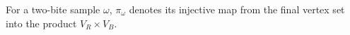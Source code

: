 \begin{definition}
For a two-bite sample \(\omega\), \(\pi_\omega\) denotes its injective map from
the final vertex set into the product \(V_R\times V_B\).
\end{definition}
